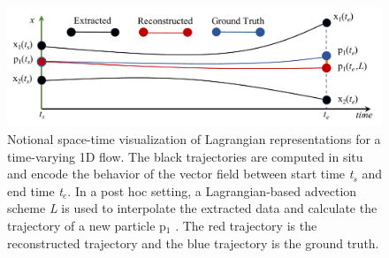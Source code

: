 %
%

\begin{figure}[!t]
\centering
\includegraphics[width=0.9\linewidth]{Images/sample.pdf}
\vspace{-5mm}
\caption{Notional space-time visualization of Lagrangian representations for a time-varying 1D flow. The black trajectories are computed in situ and encode the behavior of the vector field between start time \textit{t$_{s}$} and end time \textit{t$_{e}$}. In a post hoc setting, a Lagrangian-based advection scheme \textit{L} is used to interpolate the extracted data and calculate the trajectory of a new particle p$_{1}$ . The red trajectory is the reconstructed trajectory and the blue trajectory is the ground truth.}
\vspace{-5mm}
\label{fig:sample}
\end{figure}

%
%
%
%

